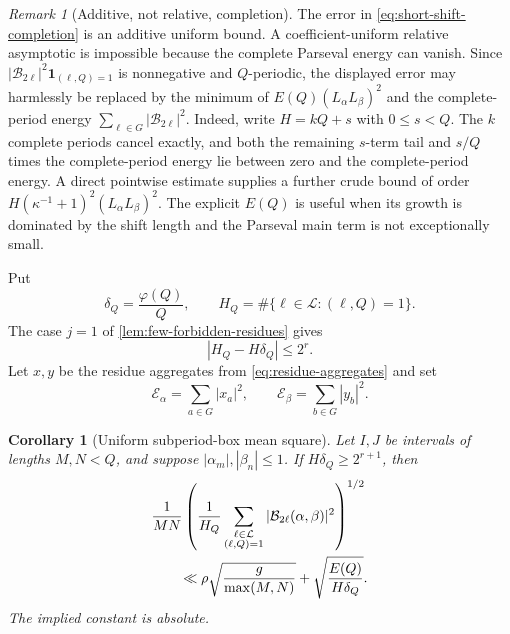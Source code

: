 \documentclass[11pt]{article}
\newtheorem{corollary}[theorem]{Corollary}
\theoremstyle{definition}
\theoremstyle{remark}
\newtheorem{remark}[theorem]{Remark}
\newcommand{\one}{\mathbf 1}
\newcommand{\cB}{\mathcal B}
\newcommand{\cE}{\mathcal E}
\newcommand{\cL}{\mathcal L}
\begin{document}
\begin{remark}[Additive, not relative, completion]\label{rem:additive-completion}
The error in \eqref{eq:short-shift-completion} is an additive uniform bound.  A coefficient-uniform relative asymptotic is impossible because the complete Parseval energy can vanish.  Since $|\cB_{2\ell}|^2\one_{(\ell,Q)=1}$ is nonnegative and $Q$-periodic, the displayed error may harmlessly be replaced by the minimum of $E(Q)(L_\alpha L_\beta)^2$ and the complete-period energy $\sum_{\ell\in G}|\cB_{2\ell}|^2$.  Indeed, write $H=kQ+s$ with $0\le s<Q$.  The $k$ complete periods cancel exactly, and both the remaining $s$-term tail and $s/Q$ times the complete-period energy lie between zero and the complete-period energy.  A direct pointwise estimate supplies a further crude bound of order $H(\kappa^{-1}+1)^2(L_\alpha L_\beta)^2$.  The explicit $E(Q)$ is useful when its growth is dominated by the shift length and the Parseval main term is not exceptionally small.
\end{remark}

Put
\begin{equation}\label{eq:unit-density-and-HQ}
 \delta_Q=\frac{\varphi(Q)}Q,
 \qquad
 H_Q=\#\{\ell\in\cL:(\ell,Q)=1\}.
\end{equation}
The case $j=1$ of \cref{lem:few-forbidden-residues} gives
\begin{equation}\label{eq:H-Q-count}
 |H_Q-H\delta_Q|\le2^r.
\end{equation}
Let $x,y$ be the residue aggregates from \eqref{eq:residue-aggregates} and set
\begin{equation}\label{eq:aggregate-energies}
 \cE_\alpha=\sum_{a\in G}|x_a|^2,
 \qquad
 \cE_\beta=\sum_{b\in G}|y_b|^2.
\end{equation}

\begin{corollary}[Uniform subperiod-box mean square]\label{cor:incomplete-box-mean-square}
Let $I,J$ be intervals of lengths $M,N<Q$, and suppose $|\alpha_m|,|\beta_n|\le1$.  If $H\delta_Q\ge2^{r+1}$, then
\begin{align}
 &\frac1{MN}
 \left(
  \frac1{H_Q}
  \sum_{\substack{\ell\in\cL\\(\ell,Q)=1}}
  |\cB_{2\ell}(\alpha,\beta)|^2
 \right)^{1/2}\notag\\
 &\qquad\ll
 \rho\sqrt{\frac{g}{\max(M,N)}}
 +\sqrt{\frac{E(Q)}{H\delta_Q}}.
 \label{eq:uniform-incomplete-box-rms}
\end{align}
The implied constant is absolute.
\end{corollary}
\end{document}
